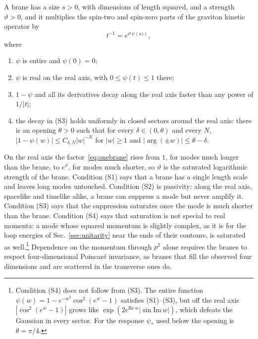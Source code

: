 \documentclass[aps,prd,10pt,twocolumn,superscriptaddress,nofootinbib,floatfix,longbibliography]{revtex4-2}
\begin{document}
A brane has a size $s>0$, with dimensions of length squared, and a strength $\vartheta>0$, and it multiplies the spin-two and spin-zero parts of the graviton kinetic operator by
\begin{equation}
\label{eq:onebrane}
t^{-1}=e^{\vartheta\,\psi(sz)},
\end{equation}
where
\begin{enumerate}[label=\textup{(S\arabic*)},leftmargin=2.4em,itemsep=0.15em]
\item $\psi$ is entire and $\psi(0)=0$;
\item $\psi$ is real on the real axis, with $0\le\psi(t)\le1$ there;
\item $1-\psi$ and all its derivatives decay along the real axis faster than any power of $1/|t|$;
\item the decay in (S3) holds uniformly in closed sectors around the real axis: there is an opening $\theta>0$ such that for every $\delta\in(0,\theta)$ and every $N$, $|1-\psi(w)|\le C_{\delta,N}|w|^{-N}$ for $|w|\ge1$ and $|\arg(\pm w)|\le\theta-\delta$.
\end{enumerate}
On the real axis the factor~\eqref{eq:onebrane} rises from $1$, for modes much longer than the brane, to $e^{\vartheta}$, for modes much shorter, so $\vartheta$ is the saturated logarithmic strength of the brane. Condition (S1) says that a brane has a single length scale and leaves long modes untouched. Condition (S2) is passivity: along the real axis, spacelike and timelike alike, a brane can suppress a mode but never amplify it. Condition (S3) says that the suppression saturates once the mode is much shorter than the brane. Condition (S4) says that saturation is not special to real momenta: a mode whose squared momentum is slightly complex, as it is for the loop energies of Sec.~\ref{sec:unitarity} near the ends of their contours, is saturated as well.\footnote{Condition (S4) does not follow from (S3). The entire function $\psi(w)=1-e^{-w^2}\cos^2(e^w-1)$ satisfies (S1)--(S3), but off the real axis $|\cos^2(e^w-1)|$ grows like $\exp(2e^{\mathrm{Re}\,w}|\sin\mathrm{Im}\,w|)$, which defeats the Gaussian in every sector. For the response $\psi_*$ used below the opening is $\theta=\pi/4$.} Dependence on the momentum through $p^2$ alone requires the branes to respect four-dimensional Poincar\'e invariance, as branes that fill the observed four dimensions and are scattered in the transverse ones do.
\end{document}
